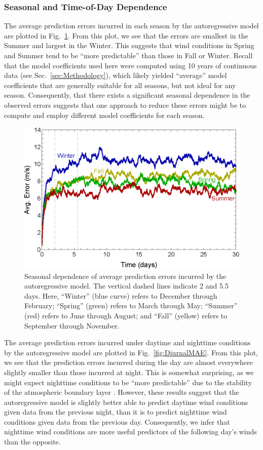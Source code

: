 \documentclass[11pt, oneside]{article}
\newcommand{\figref}[1]{Fig.~\ref{#1}}
\newcommand{\secref}[1]{Sec.~\ref{#1}}
\begin{document}
\subsubsection{Seasonal and Time-of-Day Dependence}
The average prediction errors incurred in each season by the autoregressive model are plotted in \figref{fig:SeasonalMAE}.
From this plot, we see that the errors are smallest in the Summer and largest in the Winter.
This suggests that wind conditions in Spring and Summer tend to be ``more predictable'' than those in Fall or Winter.
Recall that the model coefficients used here were computed using 10 years of continuous data (see 
\secref{sec:Methodology}), which likely yielded ``average'' model coefficients that are generally suitable for all seasons, but not ideal for any season.
Consequently, that there exists a significant seasonal dependence in the observed errors suggests that one approach to reduce these errors might be to compute and employ different model coefficients for each season.

\begin{figure}[htb]
\centering
\includegraphics[width=0.7\columnwidth]{figures/SeasonalAvgPredictionError}
\caption{Seasonal dependence of average prediction errors incurred by the autoregressive model.
The vertical dashed lines indicate 2 and 5.5 days.
Here, ``Winter'' (blue curve) refers to December through February;
``Spring'' (green) refers to March through May;
``Summer'' (red) refers to June through August; and
``Fall'' (yellow) refers to September through November.}
\label{fig:SeasonalMAE}
\end{figure}

The average prediction errors incurred under daytime and nighttime conditions by the autoregressive model are plotted in \figref{fig:DiurnalMAE}.
From this plot, we see that the prediction errors incurred during the day are almost everywhere slightly smaller than those incurred at night.
This is somewhat surprising, as we might expect nighttime conditions to be ``more predictable'' due to the stability of the atmospheric boundary layer \citep[Fig.~1.7]{Stull1988}.
However, these results suggest that the autoregressive model is slightly better able to predict daytime wind conditions given data from the previous night, than it is to predict nighttime wind conditions given data from the previous day.
Consequently, we infer that nighttime wind conditions are more useful predictors of the following day's winds than the opposite.
\end{document}
